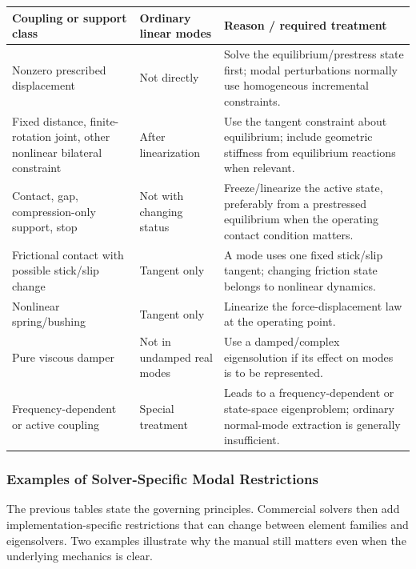 \begin{center}
\small
\begin{tabular}{|p{}|p{}|p{}|}
\hline
\textbf{Coupling or support class} & \textbf{Ordinary linear modes} & \textbf{Reason / required treatment} \\
\hline
Nonzero prescribed displacement & Not directly & Solve the equilibrium/prestress state first; modal perturbations normally use homogeneous incremental constraints. \\
\hline
Fixed distance, finite-rotation joint, other nonlinear bilateral constraint & After linearization & Use the tangent constraint about equilibrium; include geometric stiffness from equilibrium reactions when relevant. \\
\hline
Contact, gap, compression-only support, stop & Not with changing status & Freeze/linearize the active state, preferably from a prestressed equilibrium when the operating contact condition matters. \\
\hline
Frictional contact with possible stick/slip change & Tangent only & A mode uses one fixed stick/slip tangent; changing friction state belongs to nonlinear dynamics. \\
\hline
Nonlinear spring/bushing & Tangent only & Linearize the force-displacement law at the operating point. \\
\hline
Pure viscous damper & Not in undamped real modes & Use a damped/complex eigensolution if its effect on modes is to be represented. \\
\hline
Frequency-dependent or active coupling & Special treatment & Leads to a frequency-dependent or state-space eigenproblem; ordinary normal-mode extraction is generally insufficient. \\
\hline
\end{tabular}
\label{tab:coupling-modal-special}
\end{center}

\subsubsection{Examples of Solver-Specific Modal Restrictions}

The previous tables state the governing principles. Commercial solvers then add
implementation-specific restrictions that can change between element families
and eigensolvers. Two examples illustrate why the manual still matters even when
the underlying mechanics is clear.

